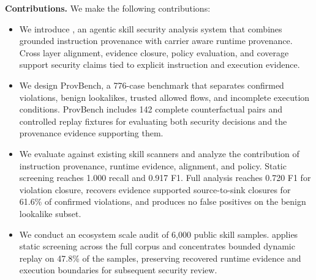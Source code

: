 \noindent
\textbf{Contributions.}
We make the following contributions:
\begin{itemize}[leftmargin=*]

    \item We introduce \system, an agentic skill security analysis system that
    combines grounded instruction provenance with carrier aware runtime
    provenance. Cross layer alignment, evidence closure, policy evaluation,
    and coverage support security claims tied to explicit instruction and
    execution evidence.

    \item We design ProvBench, a 776-case benchmark that separates confirmed
    violations, benign lookalikes, trusted allowed flows, and incomplete
    execution conditions. ProvBench includes 142 complete counterfactual pairs
    and controlled replay fixtures for evaluating both security decisions and
    the provenance evidence supporting them.

    \item We evaluate \system against existing skill scanners and analyze the
    contribution of instruction provenance, runtime evidence, alignment, and
    policy. Static screening reaches 1.000 recall and 0.917 F1. Full analysis
    reaches 0.720 F1 for violation closure, recovers evidence supported
    source-to-sink closures for 61.6\% of confirmed violations, and produces
    no false positives on the benign lookalike subset.

    \item We conduct an ecosystem scale audit of 6,000 public skill samples.
    \system applies static screening across the full corpus and concentrates
    bounded dynamic replay on 47.8\% of the samples, preserving recovered
    runtime evidence and execution boundaries for subsequent security review.

\end{itemize}